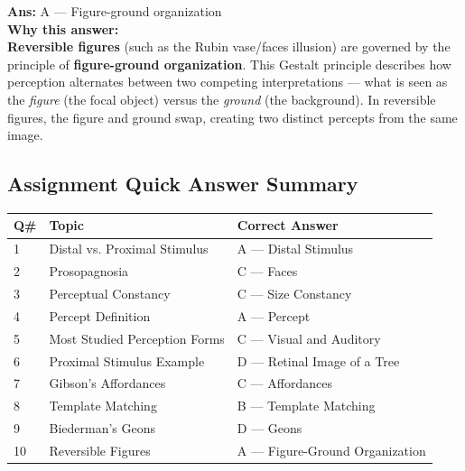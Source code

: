 \documentclass[11pt,a4paper]{article}
\newcommand{\bb}[1]{\textbf{#1}}
\begin{document}
\vspace{0.3cm}
\noindent\textbf{Ans:} A — Figure-ground organization\\[0.2cm]
\textbf{Why this answer:} \\
\textbf{Reversible figures} (such as the Rubin vase/faces illusion) are governed by the principle of \textbf{figure-ground organization}. This Gestalt principle describes how perception alternates between two competing interpretations — what is seen as the \textit{figure} (the focal object) versus the \textit{ground} (the background). In reversible figures, the figure and ground swap, creating two distinct percepts from the same image.
\vspace{0.4cm}

\medskip
\subsection*{Assignment Quick Answer Summary}

\begin{center}
\renewcommand{\arraystretch}{1.4}
\begin{tabular}{|L{0.8cm}|L{6.2cm}|L{8.2cm}|}
\hline
\bb{Q\#} & \bb{Topic} & \bb{Correct Answer} \\
 & Distal vs. Proximal Stimulus & A — Distal Stimulus \\
2 & Prosopagnosia & C — Faces \\
3 & Perceptual Constancy & C — Size Constancy \\
4 & Percept Definition & A — Percept \\
5 & Most Studied Perception Forms & C — Visual and Auditory \\
6 & Proximal Stimulus Example & D — Retinal Image of a Tree \\
7 & Gibson's Affordances & C — Affordances \\
8 & Template Matching & B — Template Matching \\
9 & Biederman's Geons & D — Geons \\
10 & Reversible Figures & A — Figure-Ground Organization \\
\hline
\end{tabular}
\end{center}

\medskip
\end{document}

